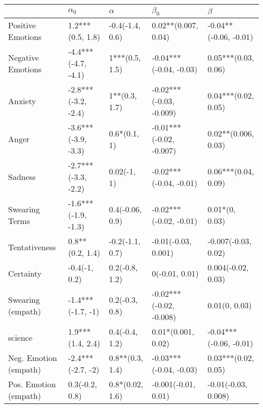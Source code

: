 \begin{tabular}{lllll}
\toprule
{} &           $\alpha_0$ &         $\alpha$ &                $\beta_0$ &                 $\beta$ \\
\midrule
Positive Emotions     &     1.2***(0.5, 1.8) &  -0.4(-1.4, 0.6) &      0.02**(0.007, 0.04) &   -0.04**(-0.06, -0.01) \\
Negative Emotions     &  -4.4***(-4.7, -4.1) &   1***(0.5, 1.5) &   -0.04***(-0.04, -0.03) &     0.05***(0.03, 0.06) \\
Anxiety               &  -2.8***(-3.2, -2.4) &    1**(0.3, 1.7) &  -0.02***(-0.03, -0.009) &     0.04***(0.02, 0.05) \\
Anger                 &  -3.6***(-3.9, -3.3) &     0.6*(0.1, 1) &  -0.01***(-0.02, -0.007) &     0.02**(0.006, 0.03) \\
Sadness               &  -2.7***(-3.3, -2.2) &      0.02(-1, 1) &   -0.02***(-0.04, -0.01) &     0.06***(0.04, 0.09) \\
Swearing Terms        &  -1.6***(-1.9, -1.3) &  0.4(-0.06, 0.9) &   -0.02***(-0.02, -0.01) &          0.01*(0, 0.03) \\
Tentativeness         &      0.8**(0.2, 1.4) &  -0.2(-1.1, 0.7) &      -0.01(-0.03, 0.001) &     -0.007(-0.03, 0.02) \\
Certainty             &        -0.4(-1, 0.2) &   0.2(-0.8, 1.2) &           0(-0.01, 0.01) &      0.004(-0.02, 0.03) \\
Swearing (empath)     &    -1.4***(-1.7, -1) &   0.2(-0.3, 0.8) &  -0.02***(-0.02, -0.008) &           0.01(0, 0.03) \\
science               &     1.9***(1.4, 2.4) &   0.4(-0.4, 1.2) &       0.01*(0.001, 0.02) &  -0.04***(-0.06, -0.01) \\
Neg. Emotion (empath) &    -2.4***(-2.7, -2) &  0.8**(0.3, 1.4) &   -0.03***(-0.04, -0.03) &     0.03***(0.02, 0.05) \\
Pos. Emotion (empath) &       0.3(-0.2, 0.8) &  0.8*(0.02, 1.6) &      -0.001(-0.01, 0.01) &     -0.01(-0.03, 0.008) \\
\bottomrule
\end{tabular}
